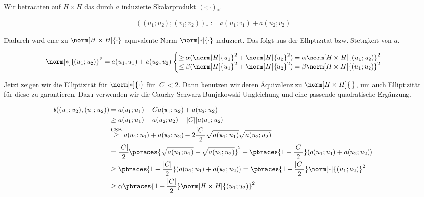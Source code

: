 \begin{solution}

Wir betrachten auf $H \times H$ das durch $a$ induzierte Skalarprodukt $(\cdot; \cdot)_\ast$.

\begin{align*}
  (
    (u_1; u_2);
    (v_1; v_2)
  )_\ast
  :=
  a(u_1; v_1) + a(u_2; v_2)
\end{align*}

Dadurch wird eine zu $\norm[H \times H]{\cdot}$ äquivalente Norm $\norm[\ast]{\cdot}$ induziert.
Das folgt aus der Elliptizität bzw. Stetigkeit von $a$.

\begin{align*}
  \norm[\ast]{(u_1; u_2)}^2
  =
  a(u_1; u_1) + a(u_2; u_2)
  \:
  \Bigg \{
  \begin{matrix}
    \geq
    \alpha
    (
      \norm[H]{u_1}^2
      +
      \norm[H]{u_2}^2
    )
    =
    \alpha
    \norm[H \times H]{(u_1; u_2)}^2 \\  
    \leq
    \beta
    (
      \norm[H]{u_1}^2
      +
      \norm[H]{u_2}^2
    )
    =
    \beta
    \norm[H \times H]{(u_1; u_2)}^2
  \end{matrix}
\end{align*}

Jetzt zeigen wir die Elliptizität für $\norm[\ast]{\cdot}$ für $|C| < 2$.
Dann benutzen wir deren Äquivalenz zu $\norm[H \times H]{\cdot}$, um auch Elliptizität für diese zu garantieren.
Dazu verwenden wir die Cauchy-Schwarz-Bunjakowski Ungleichung und eine passende quadratische Ergänzung.

\begin{align*}
  b((u_1; u_2),(u_1; u_2))
  & =
  a(u_1; u_1) + C a(u_1; u_2) + a(u_2; u_2) \\
  & \geq
  a(u_1; u_1) + a(u_2; u_2) - |C| |a(u_1; u_2)| \\
  & \stackrel
  {
    \text{CSB}
  }{\geq}
  a(u_1; u_1)
  +
  a(u_2; u_2)
  -
  2 \frac{|C|}{2}
  \sqrt{a(u_1; u_1)}
  \sqrt{a(u_2; u_2)} \\
  & =
  \frac{|C|}{2}
  \pbraces
  {
    \sqrt{a(u_1; u_1)}
    -
    \sqrt{a(u_2; u_2)}
  }^2
  +
  \pbraces
  {
    1 - \frac{|C|}{2}
  }
  (
    a(u_1; u_1)
    +
    a(u_2; u_2)
  ) \\
  & \geq
  \pbraces
  {
    1 - \frac{|C|}{2}
  }
  (
    a(u_1; u_1)
    +
    a(u_2; u_2)
  )
  =
  \pbraces
  {
    1 - \frac{|C|}{2}
  }
  \norm[\ast]{(u_1; u_2)}^2 \\
  & \geq
  \alpha
  \pbraces
  {
    1 - \frac{|C|}{2}
  }
  \norm[H \times H]{(u_1; u_2)}^2
\end{align*}

\end{solution}

